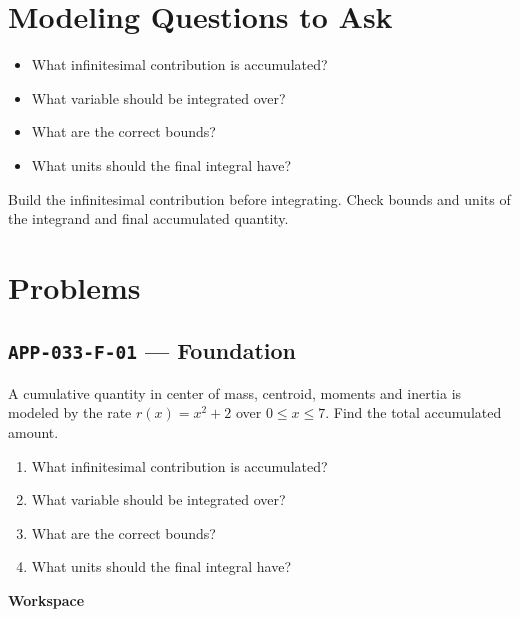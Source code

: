 \documentclass[11pt]{book}
\newcommand{\pid}[1]{\texttt{#1}}
\newcommand{\workspace}{\par\vspace{0.7in}\hrulefill\par\vspace{0.55in}\hrulefill\par}
\begin{document}
\section*{Modeling Questions to Ask}\begin{itemize}
\item What infinitesimal contribution is accumulated?
\item What variable should be integrated over?
\item What are the correct bounds?
\item What units should the final integral have?
\end{itemize}
\begin{errorbox}Build the infinitesimal contribution before integrating. Check bounds and units of the integrand and final accumulated quantity.\end{errorbox}
\section*{Problems}
\subsection*{\pid{APP-033-F-01} — Foundation}
\begin{problembox}
A cumulative quantity in center of mass, centroid, moments and inertia is modeled by the rate $r(x)=x^2+2$ over $0\le x\le 7$. Find the total accumulated amount.
\end{problembox}
\begin{promptbox}\begin{enumerate}
\item What infinitesimal contribution is accumulated?
\item What variable should be integrated over?
\item What are the correct bounds?
\item What units should the final integral have?
\end{enumerate}\end{promptbox}
\textbf{Workspace}\workspace
{}
\end{document}
